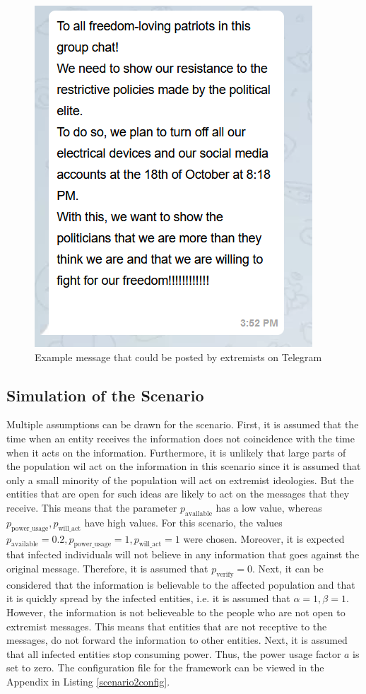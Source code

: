 \begin{figure}[!ht]
    \center
    \includegraphics[scale=.7]{figs/schwurblerchat.png}
    \caption{Example message that could be posted by extremists on Telegram}
    \label{schwurbler}
\end{figure}

\subsection{Simulation of the Scenario}
 
Multiple assumptions can be drawn for the scenario.
First, it is assumed that the time when an entity receives the
information does not coincidence with the time when it acts on the information.
Furthermore, it is unlikely that large parts of the population wil
act on the information in this scenario 
since it is assumed that only a small minority
of the population will act on extremist ideologies. But the
entities that are open for such ideas are likely to act on the 
messages that they receive.
This means that the parameter $p_{\mathrm{available}}$ has a low value,
whereas $p_{\mathrm{power\_usage}}, p_{\mathrm{will\_act}}$
have high values. For this scenario, the values 
$p_{\mathrm{available}}=0.2, 
p_{\mathrm{power\_usage}}=1, p_{\mathrm{will\_act}}=1$
were chosen.
Moreover, it is expected that infected individuals will not 
believe in any information that goes against the original message.
Therefore, it is assumed that $p_{\mathrm{verify}}=0$. Next, it
can be considered that the information is believable to 
the affected population and that it is quickly spread by 
the infected entities, i.e. it is assumed that $\alpha=1, \beta=1$.
However, the information is not believeable to the people 
who are not open to extremist messages. This means 
that entities that are not receptive to the messages, 
do not forward the information to other entities.
Next, it is assumed that all infected entities 
stop consuming power. Thus,
the power usage factor $a$ is set to zero.
The configuration file for the framework can be viewed in the Appendix in
Listing \ref{scenario2config}.

